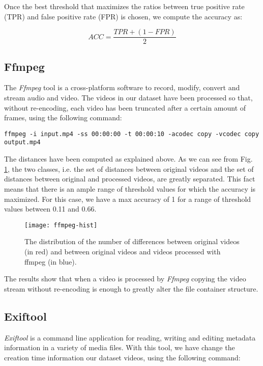 Once the best threshold that maximizes the ratios between true positive rate (TPR) and false positive rate (FPR) is chosen, we compute the accuracy as:

$$  ACC = \dfrac{TPR + (1 - FPR)}{2} $$

\subsection{Ffmpeg}

The \emph{Ffmpeg} tool is a cross-platform software to record, modify, convert and stream audio and video. The videos in our dataset have been processed so that, without re-encoding, each video has been truncated after a certain amount of frames, using the following command:

\begin{lstlisting}
ffmpeg -i input.mp4 -ss 00:00:00 -t 00:00:10 -acodec copy -vcodec copy output.mp4
\end{lstlisting}

The distances have been computed as explained above. As we can see from Fig. \ref{fig:ffmpeg-hist}, the two classes, i.e. the set of distances between original videos and the set of distances between original and processed videos, are greatly separated. This fact means that there is an ample range of threshold values for which the accuracy is maximized. For this case, we have a max accuracy of 1 for a range of threshold values between 0.11 and 0.66.

\begin{figure}
  \centering
  \texttt{[image: ffmpeg-hist]}
  \caption{The distribution of the number of differences between original videos (in red) and between original videos and videos processed with ffmpeg (in blue).}\label{fig:ffmpeg-hist}
\end{figure}

The results show that when a video is processed by \emph{Ffmpeg} copying the video stream without re-encoding is enough to greatly alter the file container structure.


\subsection{Exiftool}

\emph{Exiftool} is a command line application for reading, writing and editing metadata information in a variety of media files. With this tool, we have change the creation time information our dataset videos, using the following command:

